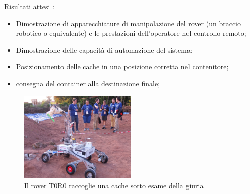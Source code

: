 \documentclass[%
corpo=11pt,
twoside,
 stile=classica,
oldstyle,
greek,%
]{toptesi}
\begin{document}
		Risultati attesi :
		\begin{itemize}
			\item Dimostrazione di apparecchiature di manipolazione del rover (un braccio robotico o equivalente)
			e le prestazioni dell'operatore nel controllo remoto;
			\item Dimostrazione delle capacità di automazione del sistema;
			\item Posizionamento delle cache in una posizione corretta nel contenitore;
			\item consegna del container alla destinazione finale;
		\end{itemize}
		\begin{figure}
			\centering
			\includegraphics[width=0.5\textwidth]{pictures/cache1.jpg}
			\caption{Il rover T0R0 raccoglie una cache sotto esame della giuria}
			\label{fig:torocache}
		\end{figure}
\end{document}
